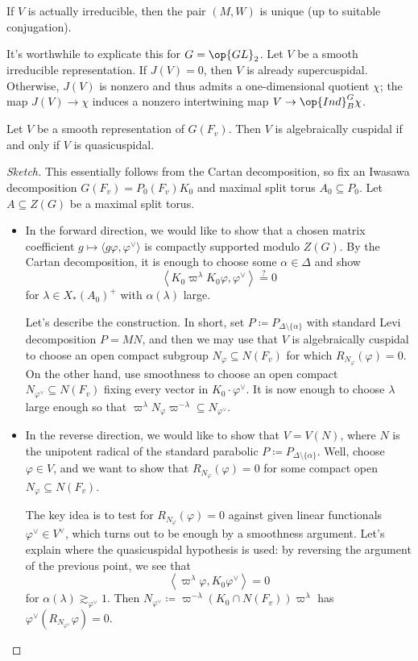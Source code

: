\documentclass{article}
\begin{document}
\begin{remark}
	If $V$ is actually irreducible, then the pair $(M,W)$ is unique (up to suitable conjugation).
\end{remark}
\begin{example}
	It's worthwhile to explicate this for $G=\op{GL}_2$. Let $V$ be a smooth irreducible representation. If $J(V)=0$, then $V$ is already supercuspidal. Otherwise, $J(V)$ is nonzero and thus admits a one-dimensional quotient $\chi$; the map $J(V)\to\chi$ induces a nonzero intertwining map $V\to\op{Ind}_B^G\chi$.
\end{example}
\begin{theorem}
	Let $V$ be a smooth representation of $G(F_v)$. Then $V$ is algebraically cuspidal if and only if $V$ is quasicuspidal.
\end{theorem}
\begin{proof}[Sketch]
	This essentially follows from the Cartan decomposition, so fix an Iwasawa decomposition $G(F_v)=P_0(F_v)K_0$ and maximal split torus $A_0\subseteq P_0$. Let $A\subseteq Z(G)$ be a maximal split torus.
	\begin{itemize}
		\item In the forward direction, we would like to show that a chosen matrix coefficient $g\mapsto\langle g\varphi,\varphi^\lor\rangle$ is compactly supported modulo $Z(G)$. By the Cartan decomposition, it is enough to choose some $\alpha\in\Delta$ and show
		\[\left\langle K_0\varpi^\lambda K_0\varphi,\varphi^\lor\right\rangle\stackrel?=0\]
		for $\lambda\in X_*(A_0)^+$ with $\alpha(\lambda)$ large.
		
		Let's describe the construction. In short, set $P\coloneqq P_{\Delta\setminus\{\alpha\}}$ with standard Levi decomposition $P=MN$, and then we may use that $V$ is algebraically cuspidal to choose an open compact subgroup $N_\varphi\subseteq N(F_v)$ for which $R_{N_\varphi}(\varphi)=0$. On the other hand, use smoothness to choose an open compact $N_{\varphi^\lor}\subseteq N(F_v)$ fixing every vector in $K_0\cdot\varphi^\lor$. It is now enough to choose $\lambda$ large enough so that $\varpi^\lambda N_\varphi\varpi^{-\lambda}\subseteq N_{\varphi^\lor}$.

		\item In the reverse direction, we would like to show that $V=V(N)$, where $N$ is the unipotent radical of the standard parabolic $P\coloneqq P_{\Delta\setminus\{\alpha\}}$. Well, choose $\varphi\in V$, and we want to show that $R_{N_\varphi}(\varphi)=0$ for some compact open $N_\varphi\subseteq N(F_v)$.

		The key idea is to test for $R_{N_\varphi}(\varphi)=0$ against given linear functionals $\varphi^\lor\in V^\lor$, which turns out to be enough by a smoothness argument. Let's explain where the quasicuspidal hypothesis is used: by reversing the argument of the previous point, we see that
		\[\left\langle\varpi^\lambda\varphi,K_0\varphi^\lor\right\rangle=0\]
		for $\alpha(\lambda)\gtrsim_{\varphi^\lor}1$. Then $N_{\varphi^\lor}\coloneqq\varpi^{-\lambda}(K_0\cap N(F_v))\varpi^\lambda$ has $\varphi^\lor\left(R_{N_{\varphi^\lor}}\varphi\right)=0$.
		\qedhere
	\end{itemize}
\end{proof}
\end{document}
